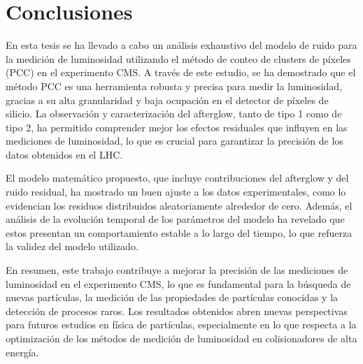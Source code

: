 \chapter{Conclusiones}

En esta tesis se ha llevado a cabo un análisis exhaustivo del modelo de ruido para la medición de luminosidad utilizando el método de conteo de clusters de píxeles (PCC) en el experimento CMS. A través de este estudio, se ha demostrado que el método PCC es una herramienta robusta y precisa para medir la luminosidad, gracias a su alta granularidad y baja ocupación en el detector de píxeles de silicio. La observación y caracterización del afterglow, tanto de tipo 1 como de tipo 2, ha permitido comprender mejor los efectos residuales que influyen en las mediciones de luminosidad, lo que es crucial para garantizar la precisión de los datos obtenidos en el LHC.

El modelo matemático propuesto, que incluye contribuciones del afterglow y del ruido residual, ha mostrado un buen ajuste a los datos experimentales, como lo evidencian los residuos distribuidos aleatoriamente alrededor de cero. Además, el análisis de la evolución temporal de los parámetros del modelo ha revelado que estos presentan un comportamiento estable a lo largo del tiempo, lo que refuerza la validez del modelo utilizado.

En resumen, este trabajo contribuye a mejorar la precisión de las mediciones de luminosidad en el experimento CMS, lo que es fundamental para la búsqueda de nuevas partículas, la medición de las propiedades de partículas conocidas y la detección de procesos raros. Los resultados obtenidos abren nuevas perspectivas para futuros estudios en física de partículas, especialmente en lo que respecta a la optimización de los métodos de medición de luminosidad en colisionadores de alta energía.
